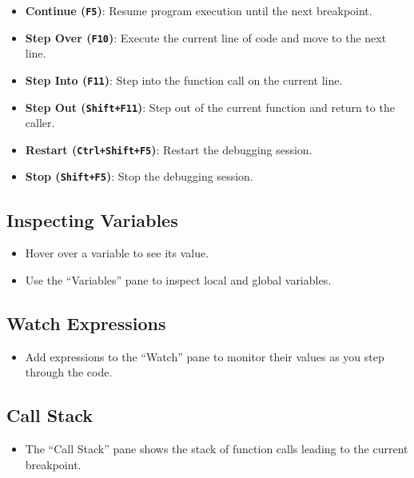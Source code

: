 \documentclass[
  letterpaper,
  DIV=11,
  numbers=noendperiod]{scrreprt}
\providecommand{\tightlist}{%
  \setlength{\itemsep}{0pt}\setlength{\parskip}{0pt}}\usepackage{longtable,booktabs,array}
\begin{document}
\begin{itemize}
\tightlist
\item
  \textbf{Continue (\texttt{F5})}: Resume program execution until the
  next breakpoint.
\item
  \textbf{Step Over (\texttt{F10})}: Execute the current line of code
  and move to the next line.
\item
  \textbf{Step Into (\texttt{F11})}: Step into the function call on the
  current line.
\item
  \textbf{Step Out (\texttt{Shift+F11})}: Step out of the current
  function and return to the caller.
\item
  \textbf{Restart (\texttt{Ctrl+Shift+F5})}: Restart the debugging
  session.
\item
  \textbf{Stop (\texttt{Shift+F5})}: Stop the debugging session.
\end{itemize}

\subsection{Inspecting Variables}\label{inspecting-variables}

\begin{itemize}
\tightlist
\item
  Hover over a variable to see its value.
\item
  Use the ``Variables'' pane to inspect local and global variables.
\end{itemize}

\subsection{Watch Expressions}\label{watch-expressions}

\begin{itemize}
\tightlist
\item
  Add expressions to the ``Watch'' pane to monitor their values as you
  step through the code.
\end{itemize}

\subsection{Call Stack}\label{call-stack}

\begin{itemize}
\tightlist
\item
  The ``Call Stack'' pane shows the stack of function calls leading to
  the current breakpoint.
\end{itemize}
\end{document}
